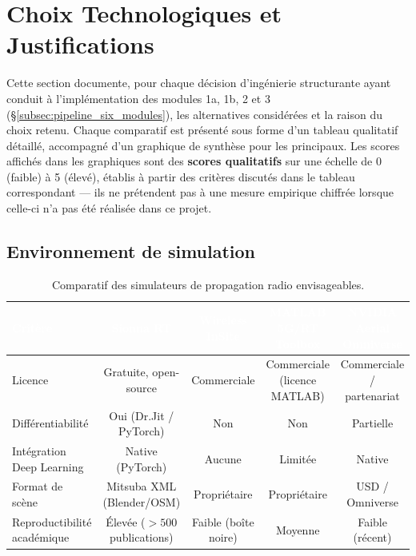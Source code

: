 \documentclass[12pt,a4paper,titlepage]{article}
\newcommand{\hd}[1]{\textcolor{white}{\textbf{#1}}}
\begin{document}
\section{Choix Technologiques et Justifications}
\label{sec:choix_tech}

Cette section documente, pour chaque décision d'ingénierie structurante ayant conduit à l'implémentation des modules 1a, 1b, 2 et 3 (\S\ref{subsec:pipeline_six_modules}), les alternatives considérées et la raison du choix retenu. Chaque comparatif est présenté sous forme d'un tableau qualitatif détaillé, accompagné d'un graphique de synthèse pour les principaux. Les scores affichés dans les graphiques sont des \textbf{scores qualitatifs} sur une échelle de 0 (faible) à 5 (élevé), établis à partir des critères discutés dans le tableau correspondant --- ils ne prétendent pas à une mesure empirique chiffrée lorsque celle-ci n'a pas été réalisée dans ce projet.

\subsection{Environnement de simulation}
\label{subsec:choix_simulateur}

\begin{table}[H]
    \centering
    \caption{Comparatif des simulateurs de propagation radio envisageables.}
    \begin{tabularx}{\textwidth}{F{3.2cm}CCCC}
        \toprule
        \hd{Critère} & \hd{Sionna RT} & \hd{Wireless InSite} & \hd{MATLAB 5G/RT Toolbox} & \hd{NVIDIA Aerial Omniverse} \\
        \midrule
        Licence & Gratuite, open-source & Commerciale & Commerciale (licence MATLAB) & Commerciale / partenariat \\
        Différentiabilité & Oui (Dr.Jit / PyTorch) & Non & Non & Partielle \\
        Intégration Deep Learning & Native (PyTorch) & Aucune & Limitée & Native \\
        Format de scène & Mitsuba XML (Blender/OSM) & Propriétaire & Propriétaire & USD / Omniverse \\
        Reproductibilité académique & Élevée ($>500$ publications) & Faible (boîte noire) & Moyenne & Faible (récent) \\
        \bottomrule
    \end{tabularx}
\end{table}
\end{document}
